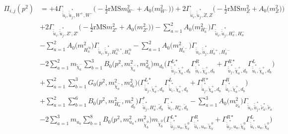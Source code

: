 \begin{itemize}
\begin{align} 
\Pi_{i,j}(p^2) &= +4 {\Gamma_{\check{\tilde{u}}_{{i}},\check{\tilde{u}}^*_{{j}},W^+,W^-}} \Big(-\frac{1}{2} \text{rMS} m^2_{W^-}  + {A_0\Big(m^2_{W^-}\Big)}\Big)+2 {\Gamma_{\check{\tilde{u}}_{{i}},\check{\tilde{u}}^*_{{j}},Z,Z}} \Big(-\frac{1}{2} \text{rMS} m^2_{Z}  + {A_0\Big(m^2_{Z}\Big)}\Big)\nonumber \\ 
 &+2 {\Gamma_{\check{\tilde{u}}_{{i}},\check{\tilde{u}}^*_{{j}},{Z'},{Z'}}} \Big(-\frac{1}{2} \text{rMS} m^2_{{Z'}}  + {A_0\Big(m^2_{{Z'}}\Big)}\Big)- \sum_{a=1}^{2}{A_0\Big(m^2_{H^-_{{a}}}\Big)} {\Gamma_{\check{\tilde{u}}_{{i}},\check{\tilde{u}}^*_{{j}},H^+_{{a}},H^-_{{a}}}}  \nonumber \\ 
 &- \sum_{a=1}^{2}{A_0\Big(m^2_{H^{'0}_{{a}}}\Big)} {\Gamma_{\check{\tilde{u}}_{{i}},\check{\tilde{u}}^*_{{j}},H^{{'0},*}_{{a}},H^{'0}_{{a}}}}  - \sum_{a=1}^{2}{A_0\Big(m^2_{H^{'-}_{{a}}}\Big)} {\Gamma_{\check{\tilde{u}}_{{i}},\check{\tilde{u}}^*_{{j}},H^{'+}_{{a}},H^{'-}_{{a}}}}  \nonumber \\ 
 &-2 \sum_{a=1}^{2}m_{\tilde{\chi}^-_{{a}}} \sum_{b=1}^{3}{B_0\Big(p^{2},m^2_{\tilde{\chi}^-_{{a}}},m^2_{d_{{b}}}\Big)} m_{d_{{b}}} \Big({\Gamma^{L*}_{\check{\tilde{u}}^*_{{j}},\tilde{\chi}^+_{{a}},d_{{b}}}} {\Gamma^R_{\check{\tilde{u}}^*_{{i}},\tilde{\chi}^+_{{a}},d_{{b}}}}  + {\Gamma^{R*}_{\check{\tilde{u}}^*_{{j}},\tilde{\chi}^+_{{a}},d_{{b}}}} {\Gamma^L_{\check{\tilde{u}}^*_{{i}},\tilde{\chi}^+_{{a}},d_{{b}}}} \Big)  \nonumber \\ 
 &+\sum_{a=1}^{2}\sum_{b=1}^{3}{G_0\Big(p^{2},m^2_{\tilde{\chi}^-_{{a}}},m^2_{d_{{b}}}\Big)} \Big({\Gamma^{L*}_{\check{\tilde{u}}^*_{{j}},\tilde{\chi}^+_{{a}},d_{{b}}}} {\Gamma^L_{\check{\tilde{u}}^*_{{i}},\tilde{\chi}^+_{{a}},d_{{b}}}}  + {\Gamma^{R*}_{\check{\tilde{u}}^*_{{j}},\tilde{\chi}^+_{{a}},d_{{b}}}} {\Gamma^R_{\check{\tilde{u}}^*_{{i}},\tilde{\chi}^+_{{a}},d_{{b}}}} \Big)\nonumber \\ 
 &+\sum_{a=1}^{2}\sum_{b=1}^{6}{B_0\Big(p^{2},m^2_{H^-_{{a}}},m^2_{\tilde{d}_{{b}}}\Big)} {\Gamma^*_{\check{\tilde{u}}^*_{{j}},H^+_{{a}},\tilde{d}_{{b}}}} {\Gamma_{\check{\tilde{u}}^*_{{i}},H^+_{{a}},\tilde{d}_{{b}}}} - \sum_{a=1}^{3}{A_0\Big(m^2_{\tilde{\nu}_{{a}}}\Big)} {\Gamma_{\check{\tilde{u}}_{{i}},\check{\tilde{u}}^*_{{j}},\tilde{\nu}^*_{{a}},\tilde{\nu}_{{a}}}}  \nonumber \\ 
 &-2 \sum_{a=1}^{3}m_{u_{{a}}} \sum_{b=1}^{8}{B_0\Big(p^{2},m^2_{u_{{a}}},m^2_{\tilde{\chi}^0_{{b}}}\Big)} m_{\tilde{\chi}^0_{{b}}} \Big({\Gamma^{L*}_{\check{\tilde{u}}^*_{{j}},u_{{a}},\tilde{\chi}^0_{{b}}}} {\Gamma^R_{\check{\tilde{u}}^*_{{i}},u_{{a}},\tilde{\chi}^0_{{b}}}}  + {\Gamma^{R*}_{\check{\tilde{u}}^*_{{j}},u_{{a}},\tilde{\chi}^0_{{b}}}} {\Gamma^L_{\check{\tilde{u}}^*_{{i}},u_{{a}},\tilde{\chi}^0_{{b}}}} \Big)  \nonumber \\ 

\end{align}
\end{itemize}
